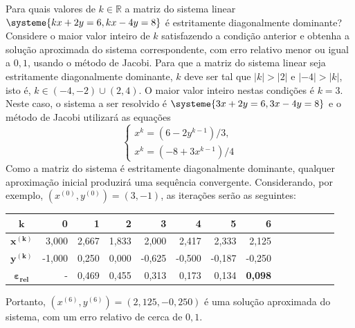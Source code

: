 \documentclass[12pt,a4paper]{article}
\newcommand*\R{\mathbb{R}}
\begin{document}
\begin{ExerciseList}
\Exercise[title={2,0}]
Para quais valores de $k \in \R$ a matriz do sistema linear $
\systeme{
k x + 2y=6,
k x - 4y=8
}$
é estritamente diagonalmente dominante? Considere o maior valor inteiro de $k$ satisfazendo a condição anterior e obtenha a solução aproximada do sistema correspondente, com erro relativo menor ou igual a $0,1$, usando o método de Jacobi.
\Answer Para que a matriz do sistema linear seja estritamente diagonalmente dominante, $k$ deve ser tal que $|k| > |2|$ e $|-4| > |k|$, isto é, $k \in (-4, -2) \cup (2, 4)$. O maior valor inteiro nestas condições é $k = 3$. Neste caso, o sistema a ser resolvido é
$
\systeme{
3 x + 2y=6,
3 x - 4y=8
}$
e o método de Jacobi utilizará as equações
\[
\begin{cases}
x^{k} = (6-2y^{k-1})/3,\\
x^{k} = (-8+3x^{k-1})/4
\end{cases}
\]
Como a matriz do sistema é estritamente diagonalmente dominante, qualquer aproximação inicial produzirá uma sequência convergente. Considerando, por exemplo, $(x^{(0)}, y^{(0)}) = (3, -1)$, as iterações serão as seguintes:
\medskip
\begin{center}
\begin{tabular}{|c|r|r|r|r|r|r|r|r|r|r|r|r|r|}
\hline
$\boldsymbol{k}$         & 0 & 1 & 2 & 3 & 4 & 5 & 6\\
\hline
$\boldsymbol{x^{(k)}}$ & 3,000 & 2,667 & 1,833 & 2,000 & 2,417 & 2,333 & 2,125 \\
\hline
$\boldsymbol{y^{(k)}}$ & -1,000 & 0,250 & 0,000 & -0,625 & -0,500 & -0,187 & -0,250 \\
\hline
$\boldsymbol{\varepsilon_{rel}}$ & - & 0,469 & 0,455 & 0,313 & 0,173 & 0,134 & \textbf{0,098}\\
\hline
\end{tabular}
\end{center}
\medskip
Portanto, $(x^{(6)}, y^{(6)}) = (2,125, -0,250)$ é uma solução aproximada do sistema, com um erro relativo de cerca de $0,1$.


\end{ExerciseList}
\end{document}
